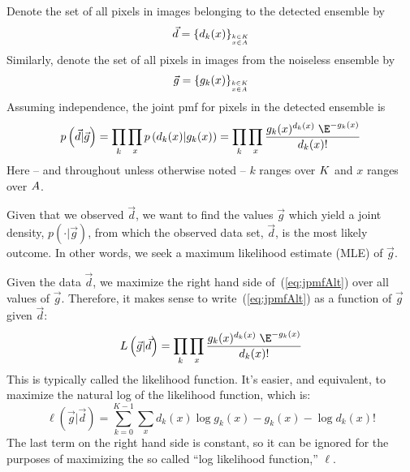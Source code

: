 Denote the set of all pixels in images belonging to the detected ensemble by
\[
\vec{d} = \left\{d_k(x)\right\}_{\stackrel{k\in K}{_{x\in A}}}
\]
Similarly, denote the set of all pixels in images from the noiseless ensemble
by
\[
\vec{g} = \left\{g_k(x)\right\}_{\stackrel{k\in K}{_{x\in A}}}
\]
Assuming independence, the joint pmf for pixels in the detected ensemble is
\begin{equation}\label{eq:jpmfAlt}
p\left(\vec{d}| \vec{g} \right) %
= \prod_{k}\prod_{x} p\left(d_k(x)|g_k(x)\right) %
= \prod_{k}\prod_{x} \frac{g_k(x)^{d_k(x)}\; \E^{-g_k(x)}}{d_k(x)!}
\end{equation}%
Here -- and throughout unless otherwise noted -- $k$ ranges over $K$ and 
$x$ ranges over $A$.

Given that we observed $\vec{d}$, we want to find the values $\vec{g}$
which yield a joint density, $p\left(\cdot| \vec{g} \right)$, from which the observed
data set, $\vec{d} $, is the most likely outcome.  In other words, we seek a
maximum likelihood estimate (MLE) of $\vec{g}$. 

Given the data $\vec{d} $, we maximize the right hand side 
of~(\ref{eq:jpmfAlt}) over all values of $\vec{g} $. Therefore, it makes sense to 
write~(\ref{eq:jpmfAlt}) as a function of $\vec{g} $ given $\vec{d} $:
\begin{equation*}%
L\left(\vec{g} |\vec{d}  \right) 
= \prod_{k}\prod_{x} \frac{g_k(x)^{d_k(x)}\; \E^{-g_k(x)}}{d_k(x)!}
\end{equation*}
This is typically called the likelihood function. 
It's easier, and equivalent, to maximize the natural log
of the likelihood function, which is:
\begin{equation}\label{eq:likelihoodALT}
\ell\left(\vec{g} |\vec{d}  \right) 
= \sum_{k=0}^{K-1} \sum_{x} d_k(x)\log g_k(x) - g_k(x) - \log
d_k(x)!
\end{equation}
The last term on the right hand side is constant, so it can be ignored for the
purposes of maximizing the so called ``log likelihood function,'' $\ell$.


